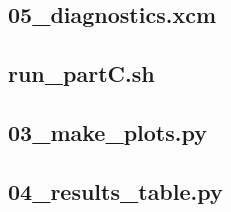 \documentclass[11pt,a4paper]{article}
\begin{document}
\subsection{05\_diagnostics.xcm}


\subsection{run\_partC.sh}


\subsection{03\_make\_plots.py}


\subsection{04\_results\_table.py}

\end{document}
